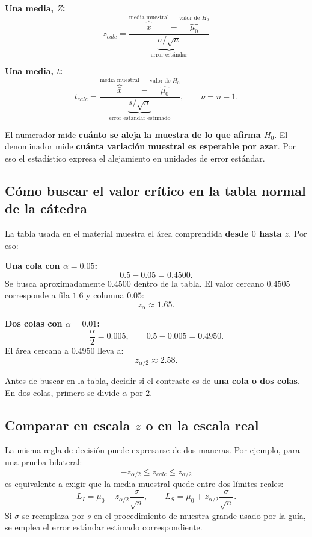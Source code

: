 \documentclass[11pt,a4paper]{article}
\begin{document}
\textbf{Una media, $Z$:}
\[
 z_{calc}=\frac{\overbrace{\bar{x}}^{\text{media muestral}}-\overbrace{\mu_0}^{\text{valor de }H_0}}
 {\underbrace{\sigma/\sqrt{n}}_{\text{error estándar}}}
\]

\textbf{Una media, $t$:}
\[
 t_{calc}=\frac{\overbrace{\bar{x}}^{\text{media muestral}}-\overbrace{\mu_0}^{\text{valor de }H_0}}
 {\underbrace{s/\sqrt{n}}_{\text{error estándar estimado}}},
 \qquad \nu=n-1.
\]

\begin{ideaclave}
El numerador mide \textbf{cuánto se aleja la muestra de lo que afirma $H_0$}. El denominador mide \textbf{cuánta variación muestral es esperable por azar}. Por eso el estadístico expresa el alejamiento en unidades de error estándar.
\end{ideaclave}

\subsection{Cómo buscar el valor crítico en la tabla normal de la cátedra}

La tabla usada en el material muestra el área comprendida \textbf{desde $0$ hasta $z$}. Por eso:

\textbf{Una cola con $\alpha=0.05$:}
\[
0.5-0.05=0.4500.
\]
Se busca aproximadamente $0.4500$ dentro de la tabla. El valor cercano $0.4505$ corresponde a fila $1.6$ y columna $0.05$:
\[
z_{\alpha}\approx1.65.
\]

\textbf{Dos colas con $\alpha=0.01$:}
\[
\frac{\alpha}{2}=0.005,
\qquad
0.5-0.005=0.4950.
\]
El área cercana a $0.4950$ lleva a:
\[
z_{\alpha/2}\approx2.58.
\]

\begin{regla}
Antes de buscar en la tabla, decidir si el contraste es de \textbf{una cola o dos colas}. En dos colas, primero se divide $\alpha$ por $2$.
\end{regla}

\subsection{Comparar en escala $z$ o en la escala real}

La misma regla de decisión puede expresarse de dos maneras. Por ejemplo, para una prueba bilateral:
\[
-z_{\alpha/2}\le z_{calc}\le z_{\alpha/2}
\]
es equivalente a exigir que la media muestral quede entre dos límites reales:
\[
L_I=\mu_0-z_{\alpha/2}\frac{\sigma}{\sqrt n},
\qquad
L_S=\mu_0+z_{\alpha/2}\frac{\sigma}{\sqrt n}.
\]
Si $\sigma$ se reemplaza por $s$ en el procedimiento de muestra grande usado por la guía, se emplea el error estándar estimado correspondiente.
\end{document}
